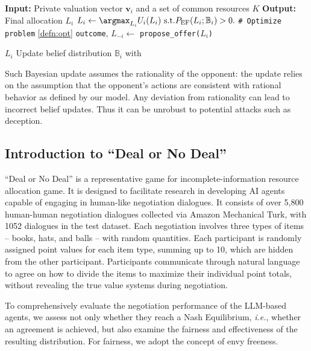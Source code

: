 \begin{algorithm}
\caption{Algorithm for the Allocation Game \ref{defn:game} with Two Players}
\begin{algorithmic}[1]
\State \textbf{Input:} Private valuation vector $\mathbf{v}_i$ and a set of common resources $K$
\State \textbf{Output:} Final allocation $L_i$
    \State $L_i \gets \argmax_{L_i} U_i(L_i) \text{ s.t.} P_{\text{EF}}(L_i; \mathbb{B}_i) > 0. $ \texttt{\# Optimize problem} \ref{defn:opt}
    \State \texttt{outcome}, $L_{-i} \gets$ \texttt{propose\_offer($L_i$)}
    
        \Return $L_i$
    \EndIf
    \State Update belief distribution $\mathbb{B}_i$ with 
\EndWhile
\end{algorithmic}
\label{alg:dnd}
\end{algorithm}

\begin{remark}
    Such Bayesian update assumes the rationality of the opponent: the update relies on the assumption that the opponent's actions are consistent with rational behavior as defined by our model. Any deviation from rationality can lead to incorrect belief updates. Thus it can be unrobust to potential attacks such as deception.
\end{remark}

\subsection{Introduction to ``Deal or No Deal''}

``Deal or No Deal'' is a representative game for incomplete-information resource allocation game. It is designed to facilitate research in developing AI agents capable of engaging in human-like negotiation dialogues. It consists of over 5,800 human-human negotiation dialogues collected via Amazon Mechanical Turk, with 1052 dialogues in the test dataset. Each negotiation involves three types of items -- books, hats, and balls -- with random quantities. Each participant is randomly assigned point values for each item type, summing up to 10, which are hidden from the other participant. Participants communicate through natural language to agree on how to divide the items to maximize their individual point totals, without revealing the true value systems during negotiation. 

To comprehensively evaluate the negotiation performance of the LLM-based agents, we assess not only whether they reach a Nash Equilibrium, \emph{i.e.}, whether an agreement is achieved, but also examine the fairness and effectiveness of the resulting distribution. For fairness, we adopt the concept of envy freeness.

